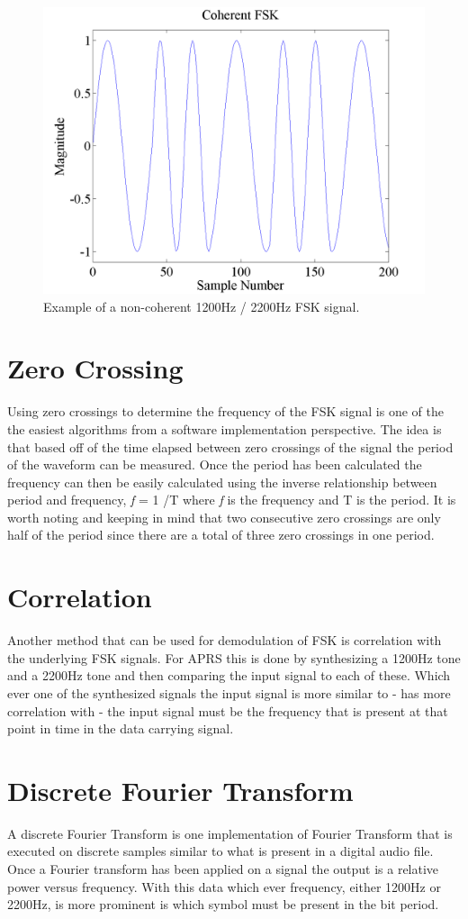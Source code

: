 \begin{figure}
  \centering
	\includegraphics[width=0.75\linewidth]{images/CoherentFSK.png} 
	\caption{Example of a non-coherent 1200Hz / 2200Hz FSK signal.}
   \label{coherentFSKExample}
\end{figure}

\section{Zero Crossing}
Using zero crossings to determine the frequency of the FSK signal is one of the the easiest algorithms from a software implementation perspective. The idea is that based off of the time elapsed between zero crossings of the signal the period of the waveform can be measured. Once the period has been calculated the frequency can then be easily calculated using the inverse relationship between period and frequency, \textit{f} = 1 /T where \textit{f} is the frequency and T is the period. It is worth noting and keeping in mind that two consecutive zero crossings are only half of the period since there are a total of three zero crossings in one period.

\section{Correlation}
Another method that can be used for demodulation of FSK is correlation with the underlying FSK signals. For APRS this is done by synthesizing a 1200Hz tone and a 2200Hz tone and then comparing the input signal to each of these. Which ever one of the synthesized signals the input signal is more similar to - has more correlation with - the input signal must be the frequency that is present at that point in time in the data carrying signal. 

\section{Discrete Fourier Transform}
A discrete Fourier Transform is one implementation of Fourier Transform that is executed on discrete samples similar to what is present in a digital audio file. Once a Fourier transform has been applied on a signal the output is a relative power versus frequency. With this data which ever frequency, either 1200Hz or 2200Hz, is more prominent is which symbol must be present in the bit period.

